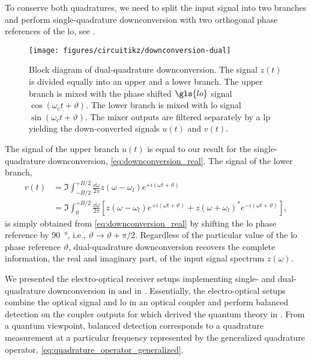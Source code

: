 To conserve both quadratures, we need to split the input signal into two branches and perform single-quadrature downconversion with two orthogonal phase references of the \gls{lo}, see .
\begin{figure}[htb]
	\centering
	\texttt{[image: figures/circuitikz/downconversion-dual]}
	\caption{Block diagram of dual-quadrature downconversion. The signal $z(t)$ is divided equally into an upper and a lower branch. The upper branch is mixed with the phase shifted $\gls{lo}$ signal $\cos(\omega_ct+\vartheta)$. The lower branch is mixed with \gls{lo} signal $\sin(\omega_ct+\vartheta)$. The mixer outputs are filtered separately by a \gls{lp} yielding the down-converted signals $u(t)$ and $v(t)$.}\label{fig:downconversion_dual}
\end{figure}
The signal of the upper branch $u(t)$ is equal to our result for the single-quadrature downconversion, \cref{eq:downconversion_real}.
The signal of the lower branch,
\begin{equation}
	\begin{split}
		v(t)
		&=
		\Im
		\int_{-B/2}^{+B/2}\frac{\dd{\omega}}{2\pi}
		z(\omega-\omega_l)
		e^{+i(\omega t+\vartheta)}
		\\
		&=
		\Im
		\int_{0}^{+B/2}\frac{\dd{\omega}}{2\pi}
		\left[
			z(\omega-\omega_l)
			e^{+i(\omega t+\vartheta)}
			+
			z(\omega+\omega_l)^*
			e^{-i(\omega t+\vartheta)}
		\right]
		,
	\end{split}
	\label{eq:downconversion_imag}	
\end{equation}
is simply obtained from \cref{eq:downconversion_real} by shifting the \gls{lo} phase reference by \SI{90}{\degree}, i.e., $\vartheta\to\vartheta+\pi/2$.
Regardless of the particular value of the \gls{lo} phase reference $\vartheta$, dual-quadrature downconversion recovers the complete information, the real and imaginary part, of the input signal spectrum $z(\omega)$.

We presented the electro-optical receiver setups implementing single- and dual-quadrature downconversion in  and  in .
Essentially, the electro-optical setups combine the optical signal and \gls{lo} in an optical coupler and perform balanced detection on the coupler outputs for which derived the quantum theory in .
From a quantum viewpoint, balanced detection corresponds to a quadrature measurement at a particular frequency represented by the generalized quadrature operator, \cref{eq:quadrature_operator_generalized}.

